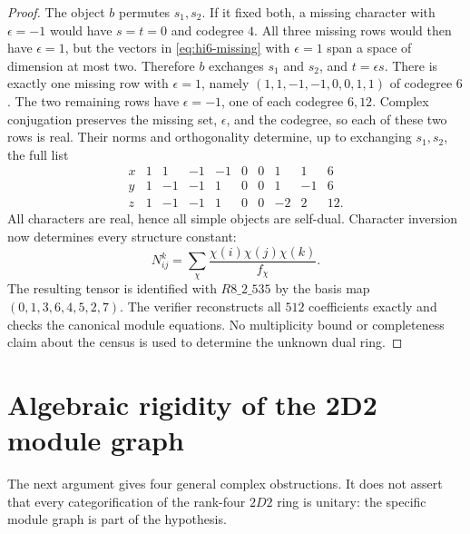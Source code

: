 \begin{proof}
The object $b$ permutes $s_1,s_2$. If it fixed both, a missing
character with $\epsilon=-1$ would have $s=t=0$ and codegree $4$.
All three missing rows would then have $\epsilon=1$, but the vectors
in \eqref{eq:hi6-missing} with $\epsilon=1$ span a space of dimension
at most two. Therefore $b$ exchanges $s_1$ and $s_2$, and
$t=\epsilon s$. There is exactly one missing row with $\epsilon=1$,
namely $(1,1,-1,-1,0,0,1,1)$ of codegree $6$. The two remaining
rows have $\epsilon=-1$, one of each codegree $6,12$. Complex
conjugation preserves the missing set, $\epsilon$, and the
codegree, so each of these two rows is real. Their norms and
orthogonality determine, up to exchanging $s_1,s_2$, the full list
\[
\begin{array}{c|rrrrrrrr|c}
x&1&1&-1&-1&0&0&1&1&6\\
y&1&-1&-1&1&0&0&1&-1&6\\
z&1&-1&-1&1&0&0&-2&2&12.
\end{array}
\]
All characters are real, hence all simple objects are self-dual.
Character inversion now determines every structure constant:
\[
N_{ij}^{k}=\sum_\chi
 \frac{\chi(i)\chi(j)\chi(k)}{f_\chi}.
\]
The resulting tensor is identified with $R8\_2\_535$ by the
basis map $(0,1,3,6,4,5,2,7)$. The verifier reconstructs all $512$
coefficients exactly and checks the canonical module equations.
No multiplicity bound or completeness claim about the census is
used to determine the unknown dual ring.
\end{proof}

\section{Algebraic rigidity of the 2D2 module graph}
\label{sec:algebraic-2d2}

The next argument gives four general complex obstructions. It does not assert that every
categorification of the rank-four $2D2$ ring is unitary: the specific
module graph is part of the hypothesis.

